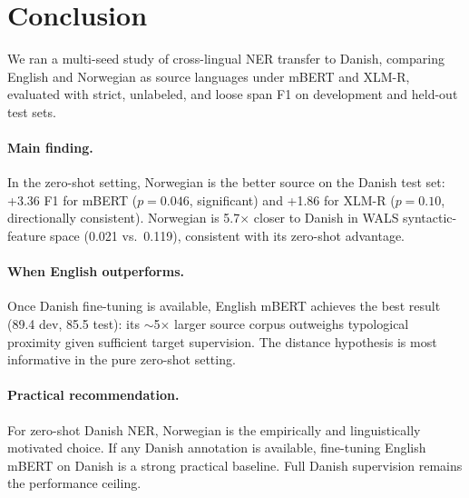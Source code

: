 \section{Conclusion}

We ran a multi-seed study of cross-lingual NER transfer to Danish, comparing English and Norwegian as source languages under mBERT and XLM-R, evaluated with strict, unlabeled, and loose span F1 on development and held-out test sets.

\paragraph{Main finding.}
In the zero-shot setting, Norwegian is the better source on the Danish test set: +3.36 F1 for mBERT ($p=0.046$, significant) and +1.86 for XLM-R ($p=0.10$, directionally consistent). Norwegian is 5.7$\times$ closer to Danish in WALS syntactic-feature space (0.021 vs.\ 0.119), consistent with its zero-shot advantage.

\paragraph{When English outperforms.}
Once Danish fine-tuning is available, English mBERT achieves the best result (89.4 dev, 85.5 test): its $\sim$5$\times$ larger source corpus outweighs typological proximity given sufficient target supervision. The distance hypothesis is most informative in the pure zero-shot setting.

\paragraph{Practical recommendation.}
For zero-shot Danish NER, Norwegian is the empirically and linguistically motivated choice. If any Danish annotation is available, fine-tuning English mBERT on Danish is a strong practical baseline. Full Danish supervision remains the performance ceiling.
